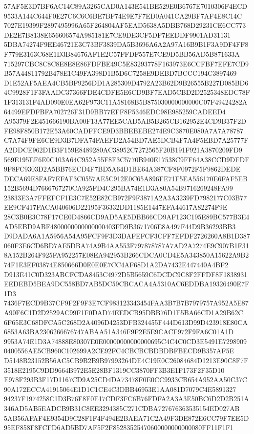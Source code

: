 \documentclass[UTF8,fontset=fandol,zihao=-4,a4paper]{ctexart}
\begin{document}
{{57AF5E3D7BF6AC14C89A3265CAD0A143E541BE529E0B6767E7010306F4ECD9533A144C644F0E27C6C6C6BE7BF74E9E7F7ED0A041CA29BF7AF4E8C14C
7027E19399F2897495996A65F264804AF5EAD5638A5DBB768D29231CE6CC773DE2E7B8138E656606574A985181E7CE9DE3CF5DF7EEDDF9901AD31131
5DBA74274F9EE46721E3C73BF3839DA5B3696A6A2A97A16B9B1F3A9DF4FF8F779E3163C68E1D3B84676AF1E2C57FFDF557E7CE9D5BB56AD5B871633A
715297CBC8C8C8E8E8E86FDFBE49C5E83293778F163973E6CCFBF7EFE7CD9B57A44811792B478E1C49FA398D1B5D6C7258E9DEBD7BCCC194C3897469
D1E52AF5AEA4CB5BF9256DD1A285309D4792A23B62D9B26555B227D085BD64C9928F1F3FAADC37366FDE4CDFE5E6CD9BF7EAD5CBD2D2525348EDC78F
1F313131F4AD090E0EA62F973C11A58168B5B875030000000000C07F49424282A64499EFDFBFA702726F31D9BB77EFF8F5346EDC98E985259CADEED4
A95379F2E451666190BA00F13A77EE5CAD5AB5B265CB162952E4CD9B37F2DFE98F850B172E53A60CADFFCE9D3BBEBEBE274E9C3870E080A7A7A78787
C7A74F9FE6CE9D3B7DFA74FAEFD2A54BD7AE5DCB4F7A4F5EBD7A25777FA2DDCE962D1B3F159E8489280AC38952C7272565F20B191F921A3870209FD9
569E195EF6E0C103A64C952A55F8F3C5770B940E17538C9FF64A38CCD9DFDF9F8FC9303D2A5BB76ECD4F7BD5A64D1BE64A387CF8F0972F5F9862DEDE
DECA69E8FAF7EFAF3C0557AE5C912E0C65A896FE71F5EA556170E6FAF5EB152B5694D7666767270CA925FD4C295BA74E1D3A80A54B9716269248FA99
23833E3A7FFEFCF1E3C7E52E82CB972F9F3871A2A3A3239FD7982177C03B77EE9CF417FACA040606D22195F36332DD1185E1447EFA44617A82274F9E
28C3B0E3C78F17CE0D4866CD9AD5AE5DBB66CD9AF123C195E89BC577B3E4AD5EBD9ABF4800000000000000403FD9B3671706E8A497F44D9B36293BB3
D9DADA6A1A5956A54A95FCF9F3D3DAFEFCF3CFF7EFDF2726260A8B1D387060F3E6CD6BD7AE5DBA74A9B4AA553F797878787A7AD2A7274E9C907B1F31
8A152B264F925FA952257E08EA942953B266CDCA0CD4E5A343850A15622A9B274F1E3EF03874E850666D0E0E0E7CC4AF68D1A2DA7432E447440A4BF2
D913E41C0D323ABCFCDA8453C4972D5B5659C6DCDC9C8F2FFDF8F1838931EEDEBD5BEA9DC558BD7AB5DC59CBCACA4A5310AC6EDDBA19326490E7F1D3
7436F7ECD9B37CF9F2F9F3E7CF983123343454FAA3B7B7B7979757A952A5E87A90F6C1D2D2529AC99F1F0DAD74EEDCB95DBB76D1E5BA66CD1A29B62C
6F65E3C68DFCA5C268D2A4096D4253DFB324455F444D613D99D423918E80CA6853A63BA2306266676747ABAA51A346F9F2E5E9CACF972F9FA6C01A1D
9953A74E1D3A74888E80307E0E00000000000000695C4C4C0CD3E5491E72989090400556AE5CB960C102699A2CE92FC4CBCBCBDBDBFBECD9B357AF5E
D5148B23152B56AC5CB9B2B9B97993264DE4C19E0C26084684D1213E90C8F7F3518E2195C9DD9664B972E5E28BF1319CC3870FF3B3E1F173F2F35D10
E978F293B3F17D1167CD9A25CD4DA73478F0E0CC9933CB654A952AA50C37C90A172ECCA41915064E1D1C1CE4C3DBB46953E1AA081D7079C4E5891327
94237F1974258C1D3B76F8F0E17CDF3FC6B76FDFA2A3A3E50BC6D2D2B251A346AD5AB5EADCB9B31C8EE3294385C271CDBA727676363535154ED027AB
5AB56AFAF4E9354D9C28F1F4F494E2BAEA71C2A49F3DE872E6CC79F7EE5D95EF858F8FCFD6AD5BD7AF5F2F85283525470600000000000080FF11F1F1
}}
\end{document}
